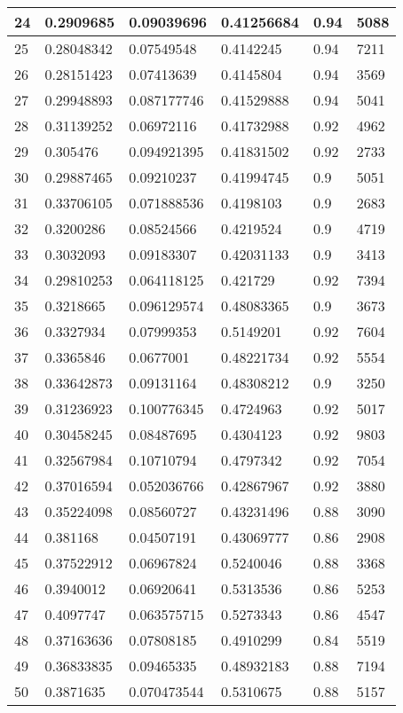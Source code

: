 \begin{longtable}{|l|l|l|l|l|l|}
24 & 0.2909685 & 0.09039696 & 0.41256684 & 0.94 & 5088 \\ \hline 
25 & 0.28048342 & 0.07549548 & 0.4142245 & 0.94 & 7211 \\ \hline 
26 & 0.28151423 & 0.07413639 & 0.4145804 & 0.94 & 3569 \\ \hline 
27 & 0.29948893 & 0.087177746 & 0.41529888 & 0.94 & 5041 \\ \hline 
28 & 0.31139252 & 0.06972116 & 0.41732988 & 0.92 & 4962 \\ \hline 
29 & 0.305476 & 0.094921395 & 0.41831502 & 0.92 & 2733 \\ \hline 
30 & 0.29887465 & 0.09210237 & 0.41994745 & 0.9 & 5051 \\ \hline 
31 & 0.33706105 & 0.071888536 & 0.4198103 & 0.9 & 2683 \\ \hline 
32 & 0.3200286 & 0.08524566 & 0.4219524 & 0.9 & 4719 \\ \hline 
33 & 0.3032093 & 0.09183307 & 0.42031133 & 0.9 & 3413 \\ \hline 
34 & 0.29810253 & 0.064118125 & 0.421729 & 0.92 & 7394 \\ \hline 
35 & 0.3218665 & 0.096129574 & 0.48083365 & 0.9 & 3673 \\ \hline 
36 & 0.3327934 & 0.07999353 & 0.5149201 & 0.92 & 7604 \\ \hline 
37 & 0.3365846 & 0.0677001 & 0.48221734 & 0.92 & 5554 \\ \hline 
38 & 0.33642873 & 0.09131164 & 0.48308212 & 0.9 & 3250 \\ \hline 
39 & 0.31236923 & 0.100776345 & 0.4724963 & 0.92 & 5017 \\ \hline 
40 & 0.30458245 & 0.08487695 & 0.4304123 & 0.92 & 9803 \\ \hline 
41 & 0.32567984 & 0.10710794 & 0.4797342 & 0.92 & 7054 \\ \hline 
42 & 0.37016594 & 0.052036766 & 0.42867967 & 0.92 & 3880 \\ \hline 
43 & 0.35224098 & 0.08560727 & 0.43231496 & 0.88 & 3090 \\ \hline 
44 & 0.381168 & 0.04507191 & 0.43069777 & 0.86 & 2908 \\ \hline 
45 & 0.37522912 & 0.06967824 & 0.5240046 & 0.88 & 3368 \\ \hline 
46 & 0.3940012 & 0.06920641 & 0.5313536 & 0.86 & 5253 \\ \hline 
47 & 0.4097747 & 0.063575715 & 0.5273343 & 0.86 & 4547 \\ \hline 
48 & 0.37163636 & 0.07808185 & 0.4910299 & 0.84 & 5519 \\ \hline 
49 & 0.36833835 & 0.09465335 & 0.48932183 & 0.88 & 7194 \\ \hline 
50 & 0.3871635 & 0.070473544 & 0.5310675 & 0.88 & 5157 \\ \hline 
\end{longtable}